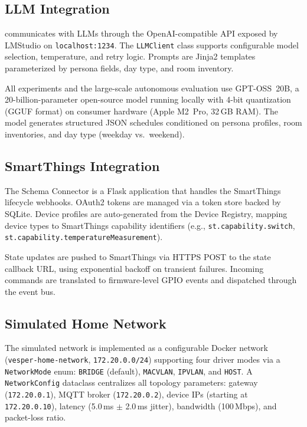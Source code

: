 \subsection{LLM Integration}

\sys{} communicates with LLMs through the OpenAI-compatible API
exposed by LMStudio on \texttt{localhost:1234}.  The
\texttt{LLMClient} class supports configurable model selection,
temperature, and retry logic.  Prompts are Jinja2 templates
parameterized by persona fields, day type, and room inventory.

All experiments and the large-scale autonomous evaluation use
GPT-OSS~20B, a 20-billion-parameter open-source model running
locally with 4-bit quantization (GGUF format) on consumer hardware
(Apple M2~Pro, 32\,GB RAM).  The model generates structured JSON
schedules conditioned on persona profiles, room inventories, and
day type (weekday vs.\ weekend).

\subsection{SmartThings Integration}

The Schema Connector is a Flask application that handles the
SmartThings lifecycle webhooks.  OAuth2 tokens are managed via a
token store backed by SQLite.  Device profiles are auto-generated
from the Device Registry, mapping \sys{} device types to
SmartThings capability identifiers (e.g.,
\texttt{st.capability.switch}, \texttt{st.capability.temperatureMeasurement}).

State updates are pushed to SmartThings via HTTPS POST to the
state callback URL, using exponential backoff on transient failures.
Incoming commands are translated to firmware-level GPIO events and
dispatched through the event bus.

\subsection{Simulated Home Network}

The simulated network is implemented as a configurable Docker network
(\texttt{vesper-home-network}, \texttt{172.20.0.0/24}) supporting
four driver modes via a \texttt{NetworkMode} enum:
\texttt{BRIDGE} (default), \texttt{MACVLAN}, \texttt{IPVLAN}, and
\texttt{HOST}.  A \texttt{NetworkConfig} dataclass centralizes all
topology parameters: gateway (\texttt{172.20.0.1}), MQTT broker
(\texttt{172.20.0.2}), device IPs (starting at \texttt{172.20.0.10}),
latency (5.0\,ms $\pm$ 2.0\,ms jitter), bandwidth (100\,Mbps), and
packet-loss ratio.

